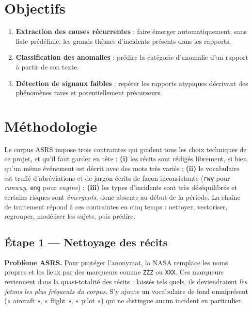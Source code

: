 \documentclass[11pt,a4paper]{article}
\begin{document}
\section{Objectifs}

\begin{enumerate}[leftmargin=1.5em]
  \item \textbf{Extraction des causes récurrentes} : faire émerger automatiquement, sans
  liste prédéfinie, les grands thèmes d'incidents présents dans les rapports.
  \item \textbf{Classification des anomalies} : prédire la catégorie d'anomalie d'un rapport
  à partir de son texte.
  \item \textbf{Détection de signaux faibles} : repérer les rapports atypiques décrivant des
  phénomènes rares et potentiellement précurseurs.
\end{enumerate}

\section{Méthodologie}

Le corpus ASRS impose trois contraintes qui guident tous les choix techniques de ce projet,
et qu'il faut garder en tête : \textbf{(i)} les récits sont rédigés librement, si bien qu'un
même événement est décrit avec des mots très variés ; \textbf{(ii)} le vocabulaire est
truffé d'abréviations et de jargon écrits de façon inconsistante (\texttt{rwy} pour
\emph{runway}, \texttt{eng} pour \emph{engine}) ; \textbf{(iii)} les types d'incidents sont
très déséquilibrés et certains risques sont \emph{émergents}, donc absents au début de la
période. La chaîne de traitement répond à ces contraintes en cinq temps : nettoyer,
vectoriser, regrouper, modéliser les sujets, puis prédire.

\subsection{Étape 1 — Nettoyage des récits}
\textbf{Problème ASRS.} Pour protéger l'anonymat, la NASA remplace les noms propres et les
lieux par des marqueurs comme \texttt{ZZZ} ou \texttt{XXX}. Ces marqueurs reviennent dans la
quasi-totalité des récits : laissés tels quels, ils deviendraient \emph{les jetons les plus
fréquents du corpus}. S'y ajoute un vocabulaire de fond omniprésent (« aircraft »,
« flight », « pilot ») qui ne distingue aucun incident en particulier.
\end{document}
